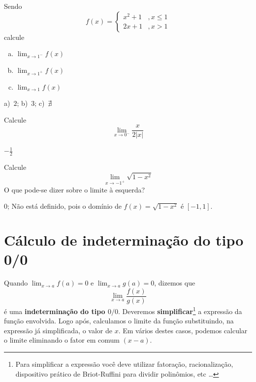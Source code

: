 \cleardoublepage\documentclass[../main.tex]{subfiles}
\begin{document}
\begin{exer}
  Sendo
  \begin{equation*}
    f(x) = \left\{
      \begin{array}{ll}
        x^2+1 &, x\leq 1\\
        2x+1 &, x>1
      \end{array}
    \right.
  \end{equation*}
  calcule
  \begin{multicols}{3}
  \begin{enumerate}[a)]
  \item $\displaystyle \lim_{x\to 1^-} f(x)$
  \item $\displaystyle \lim_{x\to 1^+} f(x)$
  \item $\displaystyle \lim_{x\to 1} f(x)$
  \end{enumerate}\end{multicols}
\end{exer}
\begin{resp}
  a)~$2$; b)~$3$; c)~$\nexists$
\end{resp}

\begin{exer}
  Calcule
  \begin{equation*}
    \lim_{x\to 0^-} \frac{x}{2|x|}
  \end{equation*}
\end{exer}
\begin{resp}
  $-\frac{1}{2}$
\end{resp}

\begin{exer}
  Calcule
  \begin{equation*}
    \lim_{x\to -1^+} \sqrt{1-x^2}
  \end{equation*}
  O que pode-se dizer sobre o limite à esquerda?
\end{exer}
\begin{resp}
  $0$; Não está definido, pois o domínio de $f(x)=\sqrt{1-x^2}$ é $[-1, 1]$.
\end{resp}

\section{Cálculo de  indeterminação do tipo 0/0}\hypertarget{Ind0/0}{}
Quando $\displaystyle \lim_{x\to a} f(a)=0$ e $\displaystyle \lim_{x\to a} g(a)=0$, dizemos que
\begin{equation*}
  \lim_{x\to a} \frac{f(x)}{g(x)}
\end{equation*}
é uma {\bf indeterminação do tipo $0/0$}. Deveremos \textbf{simplificar}\footnote{ Para simplificar a expressão você deve utilizar fatoração, racionalização, dispositivo prático de Briot-Ruffini para dividir polinômios, etc \ldots }  a  expressão da função envolvida. Logo após, calculamos o limite da função substituindo, na  expressão já simplificada, o valor de $x$. Em vários destes casos, podemos calcular o limite eliminando o fator em comum $(x-a)$.\\
\end{document}
